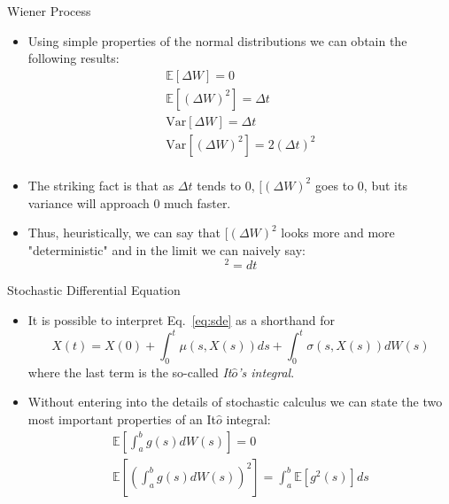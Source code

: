 \documentclass{beamer}
\begin{document}
\begin{frame}{Wiener Process}
	\begin{itemize}
		\item Using simple properties of the normal distributions we can obtain the following results:
			\begin{equation*}
				\begin{gathered}
					\mathbb{E}[\Delta W] = 0 \\
					\mathbb{E}[(\Delta W)^2] = \Delta t \\
					\text{Var}[\Delta W] = \Delta t \\
					\text{Var}[(\Delta W)^2] = 2(\Delta t)^2 \\
				\end{gathered}
			\end{equation*}
		\item The striking fact is that as $\Delta t$ tends to 0, $[(\Delta W)^2$ goes to 0, but its variance will approach 0 much faster.
		\item Thus, heuristically, we can say that $[(\Delta W)^2$ looks more and more "deterministic" and in the limit we can naively say:
			\begin{equation*}
				[dW(t)]^2 = dt
			\end{equation*}
	\end{itemize}
\end{frame}

\begin{frame}{Stochastic Differential Equation}
	\begin{itemize}
		\item It is possible to interpret Eq.~\ref{eq:sde} as a shorthand for 
			\begin{equation*}
				X(t) = X(0) + \int_0^t \mu(s,X(s)) ds + \int_0^t \sigma(s,X(s)) dW(s)
			\end{equation*}
		where the last term is the so-called \emph{It$\hat{o}$'s integral}.
		\item Without entering into the details of stochastic calculus we can state the two most important properties of an It$\hat{o}$ integral:
			\begin{equation*}
				\begin{gathered}
					\mathbb{E}\left[\int_a^b g(s) dW(s)\right] = 0 \\
					\mathbb{E}\left[\left(\int_a^b g(s) dW(s)\right)^2\right] = \int_a^b\mathbb{E}[g^2(s)]ds\\
				\end{gathered}
			\end{equation*}
	\end{itemize}  
\end{frame}
\end{document}
